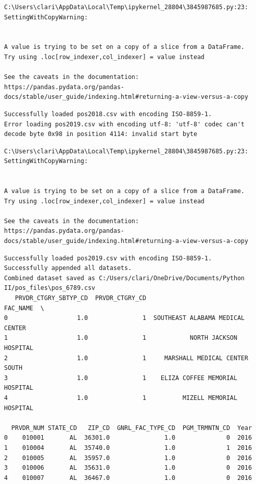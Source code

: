 \documentclass[
  letterpaper,
  DIV=11,
  numbers=noendperiod]{scrartcl}
\begin{document}
\begin{verbatim}
C:\Users\clari\AppData\Local\Temp\ipykernel_28804\3845987685.py:23: SettingWithCopyWarning:


A value is trying to be set on a copy of a slice from a DataFrame.
Try using .loc[row_indexer,col_indexer] = value instead

See the caveats in the documentation: https://pandas.pydata.org/pandas-docs/stable/user_guide/indexing.html#returning-a-view-versus-a-copy
\end{verbatim}

\begin{verbatim}
Successfully loaded pos2018.csv with encoding ISO-8859-1.
Error loading pos2019.csv with encoding utf-8: 'utf-8' codec can't decode byte 0x98 in position 4114: invalid start byte
\end{verbatim}

\begin{verbatim}
C:\Users\clari\AppData\Local\Temp\ipykernel_28804\3845987685.py:23: SettingWithCopyWarning:


A value is trying to be set on a copy of a slice from a DataFrame.
Try using .loc[row_indexer,col_indexer] = value instead

See the caveats in the documentation: https://pandas.pydata.org/pandas-docs/stable/user_guide/indexing.html#returning-a-view-versus-a-copy
\end{verbatim}

\begin{verbatim}
Successfully loaded pos2019.csv with encoding ISO-8859-1.
Successfully appended all datasets.
Combined dataset saved as C:/Users/clari/OneDrive/Documents/Python II/pos_files\pos_6789.csv
   PRVDR_CTGRY_SBTYP_CD  PRVDR_CTGRY_CD                          FAC_NAME  \
0                   1.0               1  SOUTHEAST ALABAMA MEDICAL CENTER   
1                   1.0               1            NORTH JACKSON HOSPITAL   
2                   1.0               1     MARSHALL MEDICAL CENTER SOUTH   
3                   1.0               1    ELIZA COFFEE MEMORIAL HOSPITAL   
4                   1.0               1          MIZELL MEMORIAL HOSPITAL   

  PRVDR_NUM STATE_CD   ZIP_CD  GNRL_FAC_TYPE_CD  PGM_TRMNTN_CD  Year  
0    010001       AL  36301.0               1.0              0  2016  
1    010004       AL  35740.0               1.0              1  2016  
2    010005       AL  35957.0               1.0              0  2016  
3    010006       AL  35631.0               1.0              0  2016  
4    010007       AL  36467.0               1.0              0  2016  
\end{verbatim}
\end{document}
